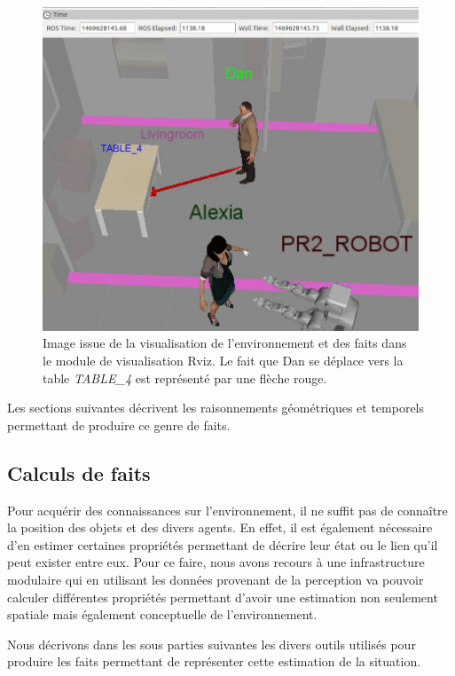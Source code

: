 \documentclass[a4paper,11pt,twoside]{StyleThese}
\begin{document}
\begin{figure}[ht!]
 \centering
  \includegraphics[width=0.99\linewidth]{./img/towardTbl.jpg} 
  \caption {Image issue de la visualisation de l'environnement et des faits dans le module de visualisation Rviz. Le fait que Dan se déplace vers la table \textit{TABLE\_4} est représenté par une flèche rouge.}
  \label{fig:fact}
\end{figure}

Les sections suivantes décrivent les raisonnements géométriques et temporels 
permettant de produire ce genre de faits.

\subsection{Calculs de faits}

Pour acquérir des connaissances sur l'environnement, il ne suffit pas de connaître la position des objets et des divers agents. En effet, il est également nécessaire d'en estimer certaines propriétés permettant de décrire leur état ou le lien qu'il peut exister entre eux. Pour ce faire, nous avons recours à une infrastructure modulaire qui en utilisant les données provenant de la perception va pouvoir calculer différentes propriétés permettant d'avoir une estimation non seulement spatiale mais également conceptuelle de l'environnement.

Nous décrivons dans les sous parties suivantes les divers outils utilisés pour produire les faits permettant de représenter cette estimation de la situation.
\end{document}
